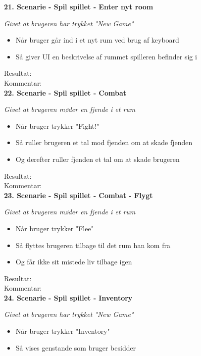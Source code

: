 \textbf{21. Scenarie - Spil spillet - Enter nyt room}

\textit{Givet at brugeren har trykket "New Game"}

\begin{itemize}
  \item Når bruger går ind i et nyt rum ved brug af keyboard
  \item Så giver UI en beskrivelse af rummet spilleren befinder sig i
\end{itemize}

Resultat:\\
Kommentar:\\

\textbf{22. Scenarie - Spil spillet - Combat}

\textit{Givet at brugeren møder en fjende i et rum}

\begin{itemize}
  \item Når bruger trykker "Fight!"
  \item Så ruller brugeren et tal mod fjenden om at skade fjenden
  \item Og derefter ruller fjenden et tal om at skade brugeren
\end{itemize}

Resultat:\\
Kommentar:\\

\textbf{23. Scenarie - Spil spillet - Combat - Flygt}

\textit{Givet at brugeren møder en fjende i et rum}

\begin{itemize}
  \item Når bruger trykker "Flee"
  \item Så flyttes brugeren tilbage til det rum han kom fra
  \item Og får ikke sit mistede liv tilbage igen
\end{itemize}

Resultat:\\
Kommentar:\\

\textbf{24. Scenarie - Spil spillet - Inventory}

\textit{Givet at brugeren har trykket "New Game"}

\begin{itemize}
  \item Når bruger trykker "Inventory"
  \item Så vises genstande som bruger besidder
\end{itemize}

